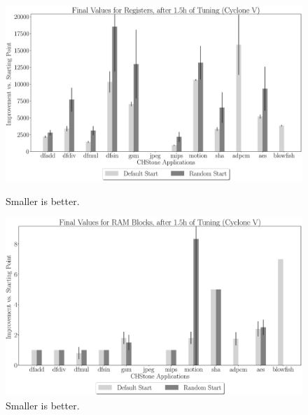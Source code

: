 \documentclass[12pt, a4paper]{article}
\begin{document}
\begin{figure}[htpb]
    \centering
    \begin{minipage}{.48\textwidth}
        \centering
        \includegraphics[width=.8\textwidth]{abs_comp_regs_5400_chstone_CycloneV}
        \caption{Smaller is better.}
    \end{minipage}%
    \begin{minipage}{.48\textwidth}
        \centering
        \includegraphics[width=.8\textwidth]{abs_comp_ram_5400_chstone_CycloneV}
        \caption{Smaller is better.}
    \end{minipage}%


\end{figure}
\end{document}
